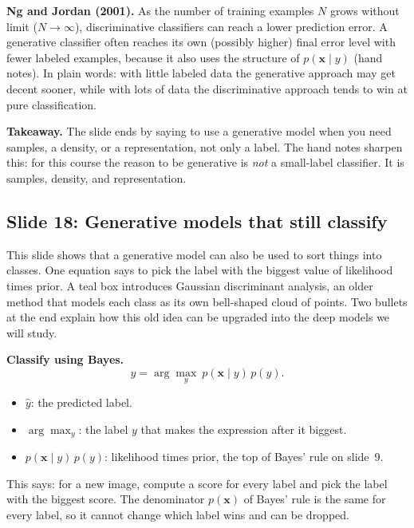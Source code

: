 \textbf{Ng and Jordan (2001).} As the number of training examples $N$ grows without limit ($N\to\infty$), discriminative classifiers can reach a lower prediction error. A generative classifier often reaches its own (possibly higher) final error level with fewer labeled examples, because it also uses the structure of $p(\mathbf{x}\mid y)$ (hand notes). In plain words: with little labeled data the generative approach may get decent sooner, while with lots of data the discriminative approach tends to win at pure classification.

\textbf{Takeaway.} The slide ends by saying to use a generative model when you need samples, a density, or a representation, not only a label. The hand notes sharpen this: for this course the reason to be generative is \textit{not} a small-label classifier. It is samples, density, and representation.

\subsection*{Slide 18: Generative models that still classify}

This slide shows that a generative model can also be used to sort things into classes. One equation says to pick the label with the biggest value of likelihood times prior. A teal box introduces Gaussian discriminant analysis, an older method that models each class as its own bell-shaped cloud of points. Two bullets at the end explain how this old idea can be upgraded into the deep models we will study.

\textbf{Classify using Bayes.}
\[
\hat y=\arg\max_{y}\ p(\mathbf{x}\mid y)\,p(y).
\]
\begin{itemize}
\item $\hat y$: the predicted label.
\item $\arg\max_y$: the label $y$ that makes the expression after it biggest.
\item $p(\mathbf{x}\mid y)\,p(y)$: likelihood times prior, the top of Bayes' rule on slide~9.
\end{itemize}
This says: for a new image, compute a score for every label and pick the label with the biggest score. The denominator $p(\mathbf{x})$ of Bayes' rule is the same for every label, so it cannot change which label wins and can be dropped.

